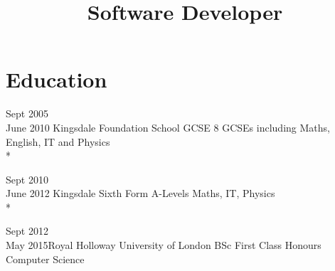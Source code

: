 \documentclass[10pt,a4paper]{moderncv}
\title{Software Developer}
\begin{document}
\maketitle

\section{Education}
\cventry
{Sept 2005\\June 2010}
{Kingsdale Foundation School}
{GCSE}
{}
{}
{8 GCSEs including Maths, English, IT and Physics\\*}

\cventry
{Sept 2010\\June 2012}
{Kingsdale Sixth Form}
{A-Levels}
{}
{}
{Maths, IT, Physics\\*}

\cventry
{Sept 2012\\May 2015}{Royal Holloway University of London}
{BSc First Class Honours}
{}
{}
{Computer Science}

\hfill
\break
\end{document}
